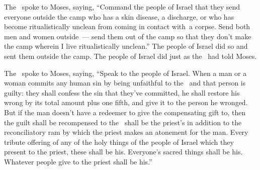 
\begin{inparaenum}
   The \lord\ spoke to Moses, saying,%
   ``Command the people of Israel that they send everyone outside the camp who has a skin disease, a discharge, or who has become ritualistically unclean from coming in contact with\understood\ a corpse.%
   Send both men and women outside~--- send them out of the camp so that they don't make the camp wherein I live ritualistically unclean.''%
   The people of Israel did so and sent them outside the camp. The people of Israel did just as the \lord\ had told Moses.%
  
   The \lord\ spoke to Moses, saying,%
   ``Speak to the people of Israel. When a man or a woman commits any human sin by being unfaithful to the \lord\ and that person is guilty:%
   they shall confess the sin that they've committed, he shall restore his wrong by its total amount plus one fifth, and give it to the person he wronged.%
   But if the man doesn't have a redeemer to give the compensating gift to, then the guilt shall be recompensed to the \lord\ shall be the priest's in addition to the reconciliatory ram by which the priest makes an atonement for the man.%
   Every tribute offering of any of the holy things of the people of Israel which they present to the priest, these shall be his.%
   Everyone's sacred things shall be his. Whatever people give to the priest shall be his.''%
  

\end{inparaenum}
